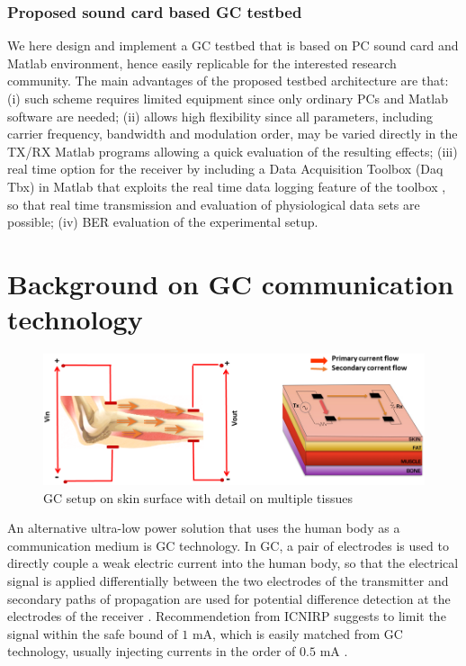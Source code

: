 \subsubsection{Proposed sound card based GC testbed}
We here design and implement a GC testbed that is based on PC sound card and Matlab environment, hence easily replicable for the interested research community. The main advantages of the proposed testbed architecture are that: (i) such scheme requires limited equipment since only ordinary PCs and Matlab software are needed; (ii) allows high flexibility since all parameters, including carrier frequency, bandwidth and modulation order, may be varied directly in the TX/RX Matlab programs allowing a quick evaluation of the resulting effects; (iii) real time option for the receiver by including a Data Acquisition Toolbox (Daq Tbx) in Matlab that exploits the real time data logging feature of the toolbox \cite{Hwang2013}, so that real time transmission and evaluation of physiological data sets are possible; (iv) BER evaluation of the experimental setup. 


\section{Background on GC communication technology}
\begin{figure}
	\includegraphics[width=\textwidth]{figures/GC_testbed/GC.png}
	\caption{GC setup on skin surface with detail on multiple tissues} \label{figGCtech}
\end{figure}

An alternative ultra-low power solution that uses the human body as a communication medium is GC technology. In GC, a pair of electrodes is used to directly couple a weak electric current into the human body, so that the electrical signal is applied differentially between the two electrodes of the transmitter and secondary paths of propagation are used for potential difference detection at the electrodes of the receiver \cite{Seyedi2013}.
Recommendetion from ICNIRP \cite{Banou2018} suggests to limit the signal within the safe bound of $1$ mA, which is easily matched from GC technology, usually injecting currents in the order of $0.5$ mA \cite{Tomlinson2018}.


